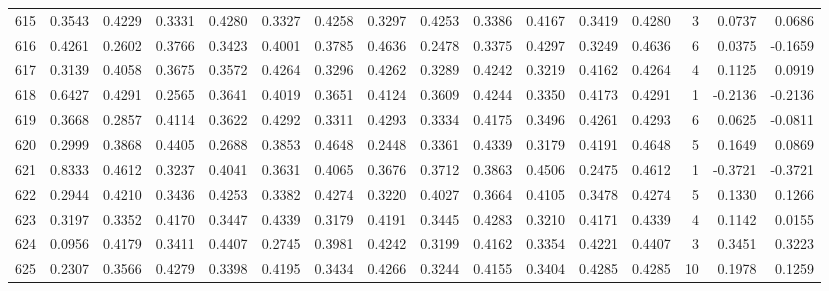 \begin{tabular}{lrrrrrrrrrrrrrrr}
615 &      0.3543 &  0.4229 &  0.3331 &  0.4280 &  0.3327 &  0.4258 &  0.3297 &  0.4253 &  0.3386 &  0.4167 &   0.3419 &     0.4280 &      3 &                    0.0737 &                     0.0686 \\
616 &      0.4261 &  0.2602 &  0.3766 &  0.3423 &  0.4001 &  0.3785 &  0.4636 &  0.2478 &  0.3375 &  0.4297 &   0.3249 &     0.4636 &      6 &                    0.0375 &                    -0.1659 \\
617 &      0.3139 &  0.4058 &  0.3675 &  0.3572 &  0.4264 &  0.3296 &  0.4262 &  0.3289 &  0.4242 &  0.3219 &   0.4162 &     0.4264 &      4 &                    0.1125 &                     0.0919 \\
618 &      0.6427 &  0.4291 &  0.2565 &  0.3641 &  0.4019 &  0.3651 &  0.4124 &  0.3609 &  0.4244 &  0.3350 &   0.4173 &     0.4291 &      1 &                   -0.2136 &                    -0.2136 \\
619 &      0.3668 &  0.2857 &  0.4114 &  0.3622 &  0.4292 &  0.3311 &  0.4293 &  0.3334 &  0.4175 &  0.3496 &   0.4261 &     0.4293 &      6 &                    0.0625 &                    -0.0811 \\
620 &      0.2999 &  0.3868 &  0.4405 &  0.2688 &  0.3853 &  0.4648 &  0.2448 &  0.3361 &  0.4339 &  0.3179 &   0.4191 &     0.4648 &      5 &                    0.1649 &                     0.0869 \\
621 &      0.8333 &  0.4612 &  0.3237 &  0.4041 &  0.3631 &  0.4065 &  0.3676 &  0.3712 &  0.3863 &  0.4506 &   0.2475 &     0.4612 &      1 &                   -0.3721 &                    -0.3721 \\
622 &      0.2944 &  0.4210 &  0.3436 &  0.4253 &  0.3382 &  0.4274 &  0.3220 &  0.4027 &  0.3664 &  0.4105 &   0.3478 &     0.4274 &      5 &                    0.1330 &                     0.1266 \\
623 &      0.3197 &  0.3352 &  0.4170 &  0.3447 &  0.4339 &  0.3179 &  0.4191 &  0.3445 &  0.4283 &  0.3210 &   0.4171 &     0.4339 &      4 &                    0.1142 &                     0.0155 \\
624 &      0.0956 &  0.4179 &  0.3411 &  0.4407 &  0.2745 &  0.3981 &  0.4242 &  0.3199 &  0.4162 &  0.3354 &   0.4221 &     0.4407 &      3 &                    0.3451 &                     0.3223 \\
625 &      0.2307 &  0.3566 &  0.4279 &  0.3398 &  0.4195 &  0.3434 &  0.4266 &  0.3244 &  0.4155 &  0.3404 &   0.4285 &     0.4285 &     10 &                    0.1978 &                     0.1259 \\

\end{tabular}
